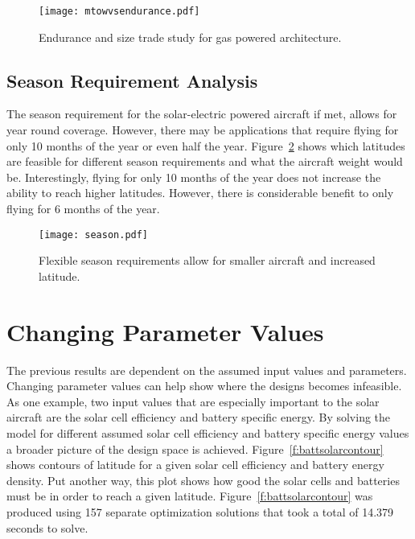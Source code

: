 \begin{figure}[h!]
	\begin{center}
	\texttt{[image: mtowvsendurance.pdf]}
    \caption{Endurance and size trade study for gas powered architecture.}
	\label{f:mtowvsendurance}
	\end{center}
\end{figure}

\subsection{Season Requirement Analysis}

The season requirement for the solar-electric powered aircraft if met, allows for year round coverage.  
However, there may be applications that require flying for only 10 months of the year or even half the year.  
Figure~\ref{f:season} shows which latitudes are feasible for different season requirements and what the aircraft weight would be. 
Interestingly, flying for only 10 months of the year does not increase the ability to reach higher latitudes.  
However, there is considerable benefit to only flying for 6 months of the year.  

\begin{figure}[h!]
	\begin{center}
	\texttt{[image: season.pdf]}
    \caption{Flexible season requirements allow for smaller aircraft and increased latitude.}
	\label{f:season}
	\end{center}
\end{figure}

\section{Changing Parameter Values}

The previous results are dependent on the assumed input values and parameters.  
Changing parameter values can help show where the designs becomes infeasible. 
As one example, two input values that are especially important to the solar aircraft are the solar cell efficiency and battery specific energy. 
By solving the model for different assumed solar cell efficiency and battery specific energy values a broader picture of the design space is achieved.   
Figure~\ref{f:battsolarcontour} shows contours of latitude for a given solar cell efficiency and battery energy density.  
Put another way, this plot shows how good the solar cells and batteries must be in order to reach a given latitude. 
Figure~\ref{f:battsolarcontour} was produced using 157 separate optimization solutions that took a total of 14.379 seconds to solve. 

